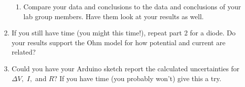 \begin{enumerate}
\begin{enumerate}
	\item Compare your data and conclusions to the data and conclusions of your lab group members. Have them look at your results as well.
\end{enumerate}

	\item If you still have time (you might this time!), repeat part 2 for a diode. Do your results support the Ohm model for how potential and current are related?

	\item Could you have your Arduino sketch report the calculated uncertainties for $\Delta V,$ $I,$ and $R?$ If you have time (you probably won't) give this a try.
\end{enumerate}


\vfill

